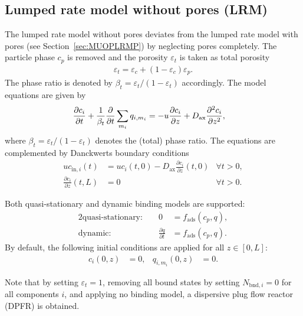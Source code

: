 \subsection{Lumped rate model without pores (LRM)}\label{sec:MUOPLRM}

The lumped rate model without pores  \cite{Guiochon2006,Felinger2004} deviates from the lumped rate model with pores (see Section~\ref{sec:MUOPLRMP}) by neglecting pores completely.
The particle phase $c_p$ is removed and the porosity $\varepsilon_t$ is taken as total porosity
\begin{align}
	\varepsilon_t = \varepsilon_c + \left( 1 - \varepsilon_c \right) \varepsilon_p. \label{eq:TotalPorosity}
\end{align}
The phase ratio is denoted by $\beta_t = \varepsilon_t / (1 - \varepsilon_t)$ accordingly.
The model equations are given by
\begin{align}
	\frac{\partial c_i}{\partial t} + \frac{1}{\beta_t} \frac{\mathop{}\!\mathrm{\partial}}{\mathop{}\!\mathrm{\partial} t} \sum_{m_i} q_{i,m_i} &= -u \frac{\partial c_i}{\partial z} + D_{\text{ax}} \frac{\partial^2 c_i}{\partial z^2},
\end{align}
where $\beta_t = \varepsilon_t / (1 - \varepsilon_t)$ denotes the (total) phase ratio.
The equations are complemented by Danckwerts boundary conditions \cite{Danckwerts1953}
\begin{align*}
	u c_{\text{in},i}(t) &= u c_i(t,0) - D_{\text{ax}} \frac{\partial c_i}{\partial z}(t, 0) & \forall t > 0,\\
	\frac{\partial c_i}{\partial z}(t, L) &= 0 & \forall t > 0.
\end{align*}

Both quasi-stationary and dynamic binding models are supported:
\begin{alignat*}{2}
	\text{quasi-stationary: }& & 0 &= f_{\text{ads}}( c_p, q), \\
	\text{dynamic: }& & \frac{\partial q}{\partial t} &= f_{\text{ads}}( c_p, q).
\end{alignat*}
By default, the following initial conditions are applied for all $z \in [0,L]$:
\begin{align}
	c_i(0, z) &= 0, & q_{i,m_i}(0,z) &= 0.
\end{align}

Note that by setting $\varepsilon_t = 1$, removing all bound states by setting $N_{\text{bnd},i} = 0$ for all components $i$, and applying no binding model, a dispersive plug flow reactor (DPFR) is obtained.

